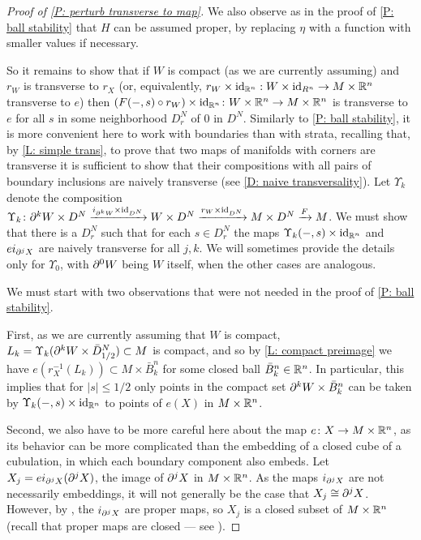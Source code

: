\begin{proof}[Proof of \cref{P: perturb transverse to map}]
	We also observe as in the proof of \cref{P: ball stability} that $H$ can be assumed proper, by replacing $\eta$ with a function with smaller values if necessary.

 	So it remains to show that if $W$ is compact (as we are currently assuming) and $r_W$ is transverse to $r_X$ (or, equivalently, $r_W \times \mathrm{id}_{\mathbb{R}^n}: W \times \mathrm{id}_{R^n} \to M \times \mathbb{R}^n$ transverse to $e$) then $(F(-,s) \circ r_W) \times \mathrm{id}_{\mathbb{R}^n} \colon W \times \mathbb{R}^n \to M \times \mathbb{R}^n$ is transverse to $e$ for all $s$ in some neighborhood $D_r^N$ of $0$ in $D^N$.
	Similarly to \cref{P: ball stability}, it is more convenient here to work with boundaries than with strata, recalling that, by \cref{L: simple trans}, to prove that two maps of manifolds with corners are transverse it is sufficient to show that their compositions with all pairs of boundary inclusions are naively transverse (see \cref{D: naive transversality}).
	Let $\Upsilon_k$ denote the composition $\Upsilon_k \colon \partial^k W \times D^N \xrightarrow{i_{\partial^k W} \times \mathrm{id}_{D^N}} W \times D^N \xrightarrow{r_W \times \mathrm{id}_{D^N}} M \times D^N \xrightarrow{F} M$.
	We must show that there is a $D_r^N$ such that for each $s\in D_r^N$ the maps $\Upsilon_k(-,s) \times \mathrm{id}_{\mathbb{R}^n}$ and $e i_{\partial^jX}$ are naively transverse for all $j,k$.
	We will sometimes provide the details only for $\Upsilon_0$, with $\partial^0 W$ being $W$ itself, when the other cases are analogous.

	We must start with two observations that were not needed in the proof of \cref{P: ball stability}.

	First, as we are currently assuming that $W$ is compact, $L_k = \Upsilon_k(\partial^k W \times \bar D^N_{1/2}) \subset M$ is compact, and so by \cref{L: compact preimage} we have $e(r_X^{-1}(L_k)) \subset M \times \bar B^n_k$ for some closed ball $\bar B^n_k \in \mathbb{R}^n$.
	In particular, this implies that for $|s| \leq 1/2$ only points in the compact set $\partial^k W \times \bar B^n_k$ can be taken by $\Upsilon_k(-,s) \times \mathrm{id}_{\mathbb{R}^n}$ to points of $e(X)$ in $M \times \mathbb{R}^n$.

	Second, we also have to be more careful here about the map $e \colon X \to M \times \mathbb{R}^n$, as its behavior can be more complicated than the embedding of a closed cube of a cubulation, in which each boundary component also embeds.
	Let $X_j = ei_{\partial^jX}(\partial^jX)$, the image of $\partial^jX$ in $M \times \mathbb{R}^n$.
	As the maps $i_{\partial^jX}$ are not necessarily embeddings, it will not generally be the case that $X_j \cong \partial^jX$.
	However, by \cite[Lemma 2.8]{Joy12}, the $i_{\partial^jX}$ are proper maps, so $X_j$ is a closed subset of $M \times \mathbb{R}^n$ (recall that proper maps are closed --- see \cite[Proposition I.10.1.1]{Bou98}).


\end{proof}
